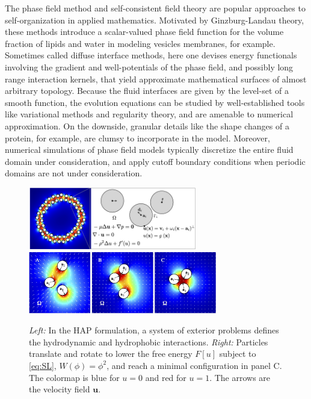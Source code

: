 The phase field method and self-consistent field theory are popular  
approaches to self-organization in applied mathematics.
Motivated by Ginzburg-Landau theory, these methods introduce a scalar-valued
phase field function for the volume fraction of
lipids and water in modeling vesicles membranes, for example. 
Sometimes called diffuse interface methods, here one devises energy functionals
involving the gradient and well-potentials of the phase field, and possibly
long range interaction kernels, that yield approximate mathematical surfaces
of almost arbitrary topology.
Because the fluid interfaces are given by the level-set
of a smooth function, the evolution equations
can be studied by well-established tools like variational methods
and regularity theory, and are amenable to numerical approximation.
On the downside, granular details like the shape changes of a protein, for
example, are clumsy to incorporate in the model.  Moreover, numerical
simulations of phase field models typically discretize the entire fluid
domain under consideration, and apply cutoff boundary conditions
when periodic domains are not under consideration. 

\begin{figure}
  \begin{center}
    \includegraphics[keepaspectratio,height=2.7cm]{figures/SpecificAim1/Domain.jpg}
    \includegraphics[keepaspectratio,height=2.7cm]{figures/SpecificAim1/3Particles.jpg}
  \end{center}
  \caption{\label{fig:flow_map} \footnotesize {\em Left:} In the HAP
  formulation, a system of exterior problems defines the hydrodynamic
  and hydrophobic interactions. {\em Right:} Particles translate and
  rotate to lower the free energy $F[u]$ subject to \eqref{eq:SL}, $W(\phi)
  = \phi^2$, and reach a minimal configuration in panel C. The colormap is
  blue for $u = 0$ and red for $u = 1$. The arrows are the velocity
  field $\mathbf{u}$.}
\end{figure}



